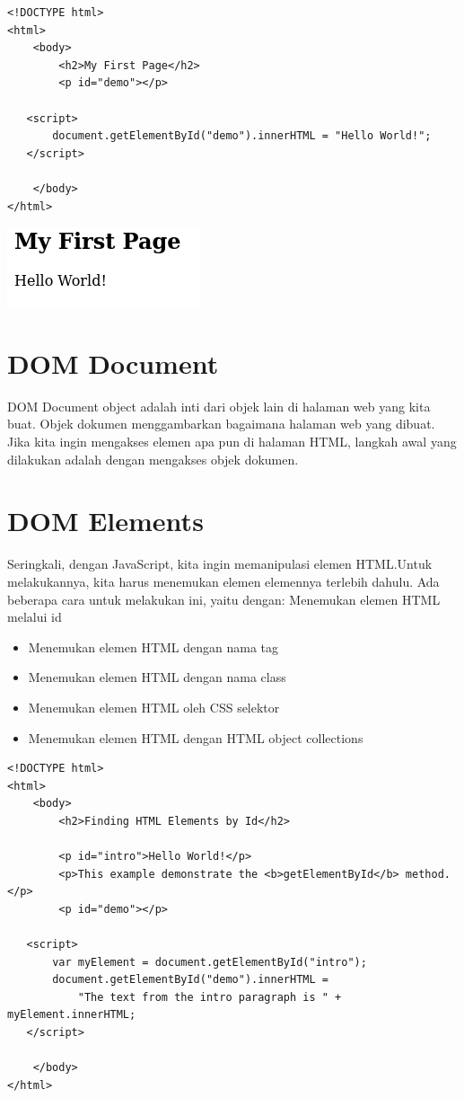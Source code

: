 \documentclass[a4paper,12pt]{article}
\begin{document}
\begin{lstlisting}[style=htmlcssjs]
<!DOCTYPE html>
<html>
    <body>
        <h2>My First Page</h2>
        <p id="demo"></p>

   <script>
       document.getElementById("demo").innerHTML = "Hello World!";
   </script>

    </body>
</html>
\end{lstlisting}
\begin{center}
    \includegraphics[scale=.7]{1.png} 
\end{center}

\section*{DOM Document}
DOM Document object adalah inti dari objek lain di halaman web yang kita buat. Objek dokumen menggambarkan bagaimana
halaman web yang dibuat. Jika kita ingin mengakses elemen apa pun di halaman HTML, langkah awal yang dilakukan adalah
dengan mengakses objek dokumen.

\section*{DOM Elements}
Seringkali, dengan JavaScript, kita ingin memanipulasi elemen HTML.\@ Untuk melakukannya, kita harus menemukan elemen
elemennya terlebih dahulu. Ada beberapa cara untuk melakukan ini, yaitu dengan: Menemukan elemen HTML melalui id
\begin{itemize}
 \item Menemukan elemen HTML dengan nama tag
 \item Menemukan elemen HTML dengan nama class
 \item Menemukan elemen HTML oleh CSS selektor
 \item Menemukan elemen HTML dengan HTML object collections
\end{itemize}
\begin{lstlisting}
<!DOCTYPE html>
<html>
    <body>
        <h2>Finding HTML Elements by Id</h2>

        <p id="intro">Hello World!</p>
        <p>This example demonstrate the <b>getElementById</b> method.</p>
        <p id="demo"></p>

   <script>
       var myElement = document.getElementById("intro");
       document.getElementById("demo").innerHTML = 
           "The text from the intro paragraph is " + myElement.innerHTML;
   </script>

    </body>
</html>
\end{lstlisting}
\end{document}
